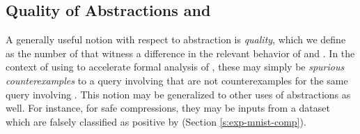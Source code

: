%
%
%
%
%

\subsection{Quality of Abstractions and \gencex}
\label{s:qual}

A generally useful notion with respect to abstraction is \textit{quality},
which we define as the number of \textit{\gencex} that witness a difference in
the relevant behavior of \abs and \cnc. In the context of using \abs to
accelerate formal analysis of \dnn, these \gencex may simply be
\textit{spurious counterexamples} \cite{cegar-nn,cleverest-nn} to a query
involving \abs that are not counterexamples for the same query involving \cnc.
This notion may be generalized to other uses of abstractions as well. For
instance, for safe compressions, they may be inputs from a dataset which
are falsely classified as positive by \abs (Section \ref{s:exp-mnist-comp}).

